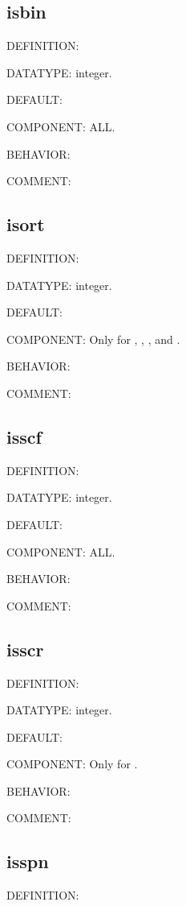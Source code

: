 \subsection{isbin}
{\color{red}DEFINITION:}

{\color{green}DATATYPE:} integer.

{\color{blue}DEFAULT:}

{\color{brown}COMPONENT:} ALL.

{\color{purple}BEHAVIOR:}

{\color{olive}COMMENT:}

\subsection{isort}
{\color{red}DEFINITION:}

{\color{green}DATATYPE:} integer.

{\color{blue}DEFAULT:}

{\color{brown}COMPONENT:} Only for {\gardenia}, {\narcissus}, {\lavender}, and {\manjushaka}.

{\color{purple}BEHAVIOR:}

{\color{olive}COMMENT:}

\subsection{isscf}
{\color{red}DEFINITION:}

{\color{green}DATATYPE:} integer.

{\color{blue}DEFAULT:}

{\color{brown}COMPONENT:} ALL.

{\color{purple}BEHAVIOR:}

{\color{olive}COMMENT:}

\subsection{isscr}
{\color{red}DEFINITION:}

{\color{green}DATATYPE:} integer.

{\color{blue}DEFAULT:}

{\color{brown}COMPONENT:} Only for {\narcissus}.

{\color{purple}BEHAVIOR:}

{\color{olive}COMMENT:}

\subsection{isspn}
{\color{red}DEFINITION:}

